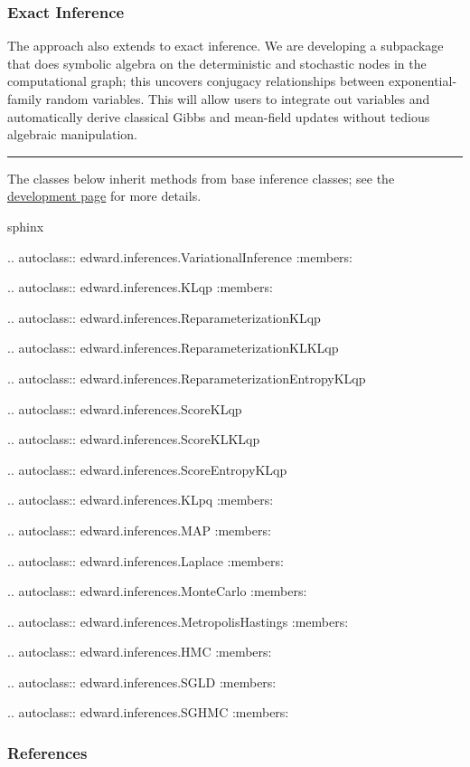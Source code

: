 \subsubsection{Exact Inference}

The approach also extends to exact inference. We are developing a
subpackage that does symbolic algebra on the deterministic and
stochastic nodes in the computational graph; this uncovers conjugacy
relationships between exponential-family random variables. This will
allow users to integrate out variables and automatically derive
classical Gibbs and mean-field updates \citep{bishop2006pattern} without
tedious algebraic manipulation.

\begin{center}\rule{3in}{0.4pt}\end{center}

The classes below inherit methods from base inference classes;
see the \href{/api/inference-development}{development page} for more
details.

{{sphinx

.. autoclass:: edward.inferences.VariationalInference
   :members:

.. autoclass:: edward.inferences.KLqp
   :members:

.. autoclass:: edward.inferences.ReparameterizationKLqp

.. autoclass:: edward.inferences.ReparameterizationKLKLqp

.. autoclass:: edward.inferences.ReparameterizationEntropyKLqp

.. autoclass:: edward.inferences.ScoreKLqp

.. autoclass:: edward.inferences.ScoreKLKLqp

.. autoclass:: edward.inferences.ScoreEntropyKLqp

.. autoclass:: edward.inferences.KLpq
   :members:

.. autoclass:: edward.inferences.MAP
   :members:

.. autoclass:: edward.inferences.Laplace
   :members:

.. autoclass:: edward.inferences.MonteCarlo
   :members:

.. autoclass:: edward.inferences.MetropolisHastings
   :members:

.. autoclass:: edward.inferences.HMC
   :members:

.. autoclass:: edward.inferences.SGLD
:members:

.. autoclass:: edward.inferences.SGHMC
:members:

}}

\subsubsection{References}\label{references}
